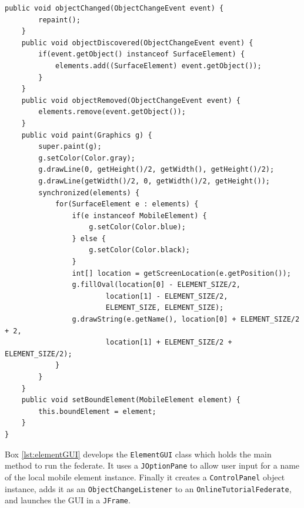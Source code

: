 \documentclass[]{article}
\begin{document}
\begin{Code}
\begin{lstlisting}[caption={ControlPanel object class (continued)},label={lst:controlPanel2}]
	public void objectChanged(ObjectChangeEvent event) { 
		repaint(); 
	}
	public void objectDiscovered(ObjectChangeEvent event) {
		if(event.getObject() instanceof SurfaceElement) {
			elements.add((SurfaceElement) event.getObject());
		}
	}
	public void objectRemoved(ObjectChangeEvent event) {
		elements.remove(event.getObject());
	}
	public void paint(Graphics g) {
		super.paint(g);
		g.setColor(Color.gray);
		g.drawLine(0, getHeight()/2, getWidth(), getHeight()/2);
		g.drawLine(getWidth()/2, 0, getWidth()/2, getHeight());
		synchronized(elements) {
			for(SurfaceElement e : elements) {
				if(e instanceof MobileElement) {
					g.setColor(Color.blue);
				} else {
					g.setColor(Color.black);
				}
				int[] location = getScreenLocation(e.getPosition());
				g.fillOval(location[0] - ELEMENT_SIZE/2, 
						location[1] - ELEMENT_SIZE/2, 
						ELEMENT_SIZE, ELEMENT_SIZE);
				g.drawString(e.getName(), location[0] + ELEMENT_SIZE/2 + 2, 
						location[1] + ELEMENT_SIZE/2 + ELEMENT_SIZE/2);
			}
		}
	}
	public void setBoundElement(MobileElement element) {
		this.boundElement = element;
	}
}
\end{lstlisting}
\end{Code}

Box \ref{lst:elementGUI} develops the \texttt{ElementGUI} class which holds the main method to run the federate. It uses a \texttt{JOptionPane} to allow user input for a name of the local mobile element instance. Finally it creates a \texttt{ControlPanel} object instance, adds it as an \texttt{ObjectChangeListener} to an \texttt{OnlineTutorialFederate}, and launches the GUI in a \texttt{JFrame}.
\end{document}
